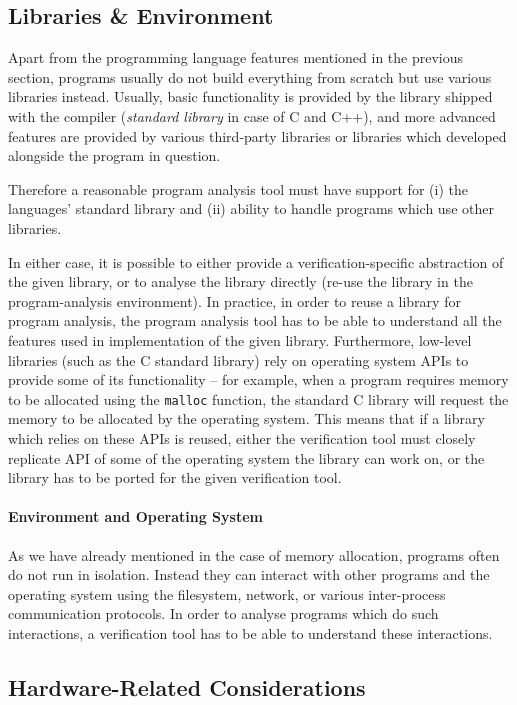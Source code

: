 \subsection{Libraries \& Environment}

Apart from the programming language features mentioned in the previous section,
programs usually do not build everything from scratch but use various libraries
instead.
Usually, basic functionality is provided by the library shipped with the
compiler (\emph{standard library} in case of C and C++), and more advanced
features are provided by various third-party libraries or libraries which
developed alongside the program in question.

Therefore a reasonable program analysis tool must have support for (i) the
languages' standard library and (ii) ability to handle programs which use other
libraries.

In either case, it is possible to either provide a verification-specific
abstraction of the given library, or to analyse the library directly (re-use
the library in the program-analysis environment).
In practice, in order to reuse a library for program analysis, the program
analysis tool has to be able to understand all the features used in
implementation of the given library.
Furthermore, low-level libraries (such as the C standard library) rely on
operating system APIs to provide some of its functionality -- for example, when
a program requires memory to be allocated using the \texttt{malloc} function,
the standard C library will request the memory to be allocated by the operating
system.
This means that if a library which relies on these APIs is reused, either the
verification tool must closely replicate API of some of the operating system
the library can work on, or the library has to be ported for the given
verification tool.

\paragraph{Environment and Operating System} As we have already mentioned in
the case of memory allocation, programs often do not run in isolation.
Instead they can interact with other programs and the operating system using
the filesystem, network, or various inter-process communication protocols.
In order to analyse programs which do such interactions, a verification tool
has to be able to understand these interactions.

\subsection{Hardware-Related Considerations}

